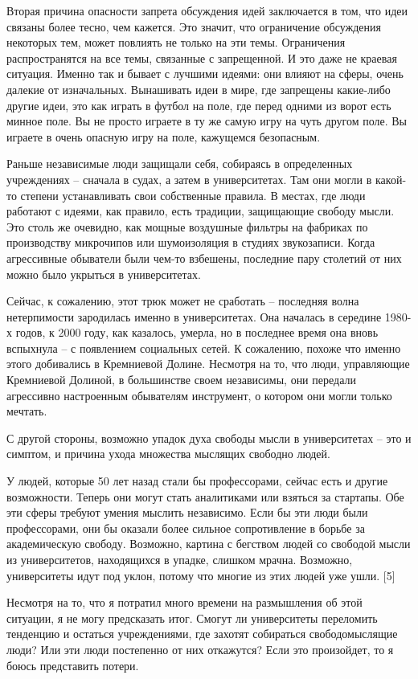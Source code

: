 \documentclass[ebook,12pt,oneside,openany]{memoir}
\begin{document}
Вторая причина опасности запрета обсуждения идей заключается в том,
что идеи связаны более тесно, чем кажется. Это значит, что ограничение
обсуждения некоторых тем, может повлиять не только на эти темы.
Ограничения распространятся на все темы, связанные с запрещенной. И
это даже не краевая ситуация. Именно так и бывает с лучшими идеями:
они влияют на сферы, очень далекие от изначальных. Вынашивать идеи в
мире, где запрещены какие-либо другие идеи, это как играть в футбол на
поле, где перед одними из ворот есть минное поле. Вы не просто играете
в ту же самую игру на чуть другом поле. Вы играете в очень опасную
игру на поле, кажущемся безопасным.

Раньше независимые люди защищали себя, собираясь в определенных
учреждениях – сначала в судах, а затем в университетах. Там они могли
в какой-то степени устанавливать свои собственные правила. В местах,
где люди работают с идеями, как правило, есть традиции, защищающие
свободу мысли. Это столь же очевидно, как мощные воздушные фильтры на
фабриках по производству микрочипов или шумоизоляция в студиях
звукозаписи. Когда агрессивные обыватели были чем-то взбешены,
последние пару столетий от них можно было укрыться в университетах.

Сейчас, к сожалению, этот трюк может не сработать – последняя волна
нетерпимости зародилась именно в университетах. Она началась в
середине 1980-х годов, к 2000 году, как казалось, умерла, но в
последнее время она вновь вспыхнула – с появлением социальных сетей. К
сожалению, похоже что именно этого добивались в Кремниевой Долине.
Несмотря на то, что люди, управляющие Кремниевой Долиной, в
большинстве своем независимы, они передали агрессивно настроенным
обывателям инструмент, о котором они могли только мечтать.

С другой стороны, возможно упадок духа свободы мысли в университетах –
это и симптом, и причина ухода множества мыслящих свободно людей.

У людей, которые 50 лет назад стали бы профессорами, сейчас есть и
другие возможности. Теперь они могут стать аналитиками или взяться за
стартапы. Обе эти сферы требуют умения мыслить независимо. Если бы эти
люди были профессорами, они бы оказали более сильное сопротивление в
борьбе за академическую свободу. Возможно, картина с бегством людей со
свободой мысли из университетов, находящихся в упадке, слишком мрачна.
Возможно, университеты идут под уклон, потому что многие из этих людей
уже ушли. [5]

Несмотря на то, что я потратил много времени на размышления об этой
ситуации, я не могу предсказать итог. Смогут ли университеты
переломить тенденцию и остаться учреждениями, где захотят собираться
свободомыслящие люди? Или эти люди постепенно от них откажутся? Если
это произойдет, то я боюсь представить потери.
\end{document}
